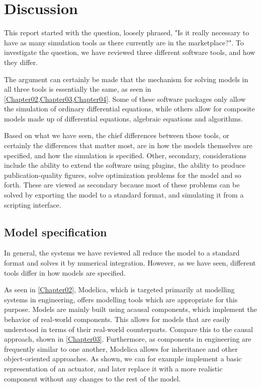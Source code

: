 \documentclass[\rootfolder/main.tex]{subfiles}
\begin{document}
\chapter{Discussion} %

\label{Chapter05} %

This report started with the question, loosely phrased, "Is it really necessary to have as many simulation tools as there currently are in the marketplace?".
To investigate the question, we have reviewed three different software tools, and how they differ.

The argument can certainly be made that the mechanism for solving models in all three tools is essentially the same, as seen in \cref{Chapter02,Chapter03,Chapter04}.
Some of these software packages only allow the simulation of ordinary differential equations, while others allow for composite models made up of differential equations, algebraic equations and algorithms.

Based on what we have seen, the chief differences between these tools, or certainly the differences that matter most, are in how the models themselves are specified, and how the simulation is specified.
Other, secondary, considerations include the ability to extend the software using plugins, the ability to produce publication-quality figures, solve optimization problems for the model and so forth.
These are viewed as secondary because most of these problems can be solved by exporting the model to a standard format, and simulating it from a scripting interface.

\section{Model specification}

In general, the systems we have reviewed all reduce the model to a standard format and solves it by numerical integration.
However, as we have seen, different tools differ in how models are specified.

As seen in \cref{Chapter02}, Modelica, which is targeted primarily at modelling systems in engineering, offers modelling tools which are appropriate for this purpose.
Models are mainly built using acausal components, which implement the behavior of real-world components.
This allows for models that are easily understood in terms of their real-world counterparts.
Compare this to the causal approach, shown in \cref{Chapter03}.
Furthermore, as components in engineering are frequently similar to one another, Modelica allows for inheritance and other object-oriented approaches.
As shown, we can for example implement a basic representation of an actuator, and later replace it with a more realistic component without any changes to the rest of the model.
\end{document}
